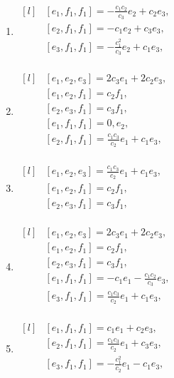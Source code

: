 \begin{adjustwidth*}{-0.5cm}{0cm}
\begin{multicols*}{2}
\begin{enumerate}
    \item $\begin{matrix*}[l]
            & [e_1, f_1, f_1] =  - \frac{c_{1} c_{2}}{c_{3}} e_2 + c_{2} e_3, \\
            & [e_2, f_1, f_1] =  - c_{1} e_2 + c_{3} e_3, \\
            & [e_3, f_1, f_1] =  - \frac{c_{1}^2}{c_{3}} e_2 + c_{1} e_3, \\
        \end{matrix*}$

    \item $\begin{matrix*}[l]
            & [e_1, e_2, e_3] = 2 c_{3} e_1  + 2 c_{2} e_3, \\
            & [e_1, e_2, f_1] = c_{2} f_1, \\
            & [e_2, e_3, f_1] = c_{3} f_1, \\
            & [e_1, f_1, f_1] =  0, e_2 , \\
            & [e_2, f_1, f_1] = \frac{c_{1} c_{3}}{c_{2}} e_1  + c_{1} e_3, \\
        \end{matrix*}$

    \item $\begin{matrix*}[l]
            & [e_1, e_2, e_3] = \frac{c_{1} c_{3}}{c_{2}} e_1  + c_{1} e_3, \\
            & [e_1, e_2, f_1] = c_{2} f_1, \\
            & [e_2, e_3, f_1] = c_{3} f_1, \\
        \end{matrix*}$

    \item $\begin{matrix*}[l]
            & [e_1, e_2, e_3] = 2 c_{3} e_1  + 2 c_{2} e_3, \\
            & [e_1, e_2, f_1] = c_{2} f_1, \\
            & [e_2, e_3, f_1] = c_{3} f_1, \\
            & [e_1, f_1, f_1] = -c_{1} e_1  - \frac{c_{1} c_{2}}{c_{3}} e_3, \\
            & [e_3, f_1, f_1] = \frac{c_{1} c_{3}}{c_{2}} e_1  + c_{1} e_3, \\
        \end{matrix*}$

    \item $\begin{matrix*}[l]
            & [e_1, f_1, f_1] = c_{1} e_1  + c_{2} e_3, \\
            & [e_2, f_1, f_1] = \frac{c_{1} c_{3}}{c_{2}} e_1  + c_{3} e_3, \\
            & [e_3, f_1, f_1] = -\frac{c_{1}^2}{c_{2}} e_1  - c_{1} e_3, \\
        \end{matrix*}$


\end{enumerate}
\end{multicols*}
\end{adjustwidth*}
